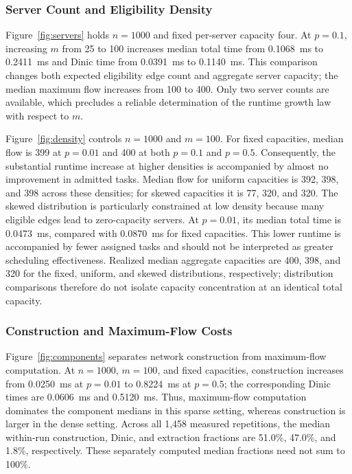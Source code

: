 \documentclass[conference]{IEEEtran}
\theoremstyle{definition}
\theoremstyle{remark}
\begin{document}
\subsubsection{Server Count and Eligibility Density}
Figure~\ref{fig:servers} holds $n=1000$ and fixed per-server capacity four.
At $p=0.1$, increasing $m$ from 25 to 100 increases median total time from
0.1068~ms to 0.2411~ms and Dinic time from 0.0391~ms to 0.1140~ms.
This comparison changes both expected eligibility edge count and aggregate
server capacity; the median maximum flow increases from 100 to 400.
Only two server counts are available, which precludes a reliable determination
of the runtime growth law with respect to $m$.

Figure~\ref{fig:density} controls $n=1000$ and $m=100$. For fixed capacities,
median flow is 399 at $p=0.01$ and 400 at both $p=0.1$ and $p=0.5$.
Consequently, the substantial runtime increase at higher densities is accompanied
by almost no improvement in admitted tasks. Median flow for uniform capacities
is 392, 398, and 398 across these densities; for skewed capacities it is
77, 320, and 320. The skewed distribution is particularly constrained at low
density because many eligible edges lead to zero-capacity servers. At $p=0.01$,
its median total time is 0.0473~ms, compared with 0.0870~ms for fixed capacities.
This lower runtime is accompanied by fewer assigned tasks and should not be
interpreted as greater scheduling effectiveness. Realized median aggregate
capacities are 400, 398, and 320 for the fixed, uniform, and skewed distributions,
respectively; distribution comparisons therefore do not isolate capacity
concentration at an identical total capacity.

\subsubsection{Construction and Maximum-Flow Costs}
Figure~\ref{fig:components} separates network construction from maximum-flow
computation. At $n=1000$, $m=100$, and fixed capacities, construction increases
from 0.0250~ms at $p=0.01$ to 0.8224~ms at $p=0.5$; the corresponding
Dinic times are 0.0606~ms and 0.5120~ms. Thus, maximum-flow computation
dominates the component medians in this sparse setting, whereas construction
is larger in the dense setting. Across all 1,458 measured repetitions, the
median within-run construction, Dinic, and extraction fractions are 51.0\%,
47.0\%, and 1.8\%, respectively. These separately computed median fractions
need not sum to 100\%.
\end{document}
